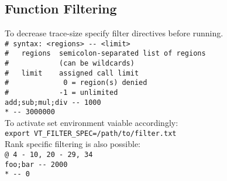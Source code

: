 \begin{multicols}{3}
\section{Function Filtering}
To decrease trace-size specify filter directives before running.\\
\verb!# syntax: <regions> -- <limit>!\\
\verb!#   regions  semicolon-separated list of regions!\\
\verb!#            (can be wildcards)!\\
\verb!#   limit    assigned call limit!\\
\verb!#             0 = region(s) denied!\\
\verb!#            -1 = unlimited!\\
\verb!add;sub;mul;div -- 1000!\\
\verb!* -- 3000000!\\
To activate set environment vaiable accordingly:\\
\texttt{export VT\_FILTER\_SPEC=/path/to/filter.txt}\\
Rank specific filtering is also possible:\\
\verb!@ 4 - 10, 20 - 29, 34!\\
\verb!foo;bar -- 2000!\\
\verb!* -- 0!\\


\end{multicols}
